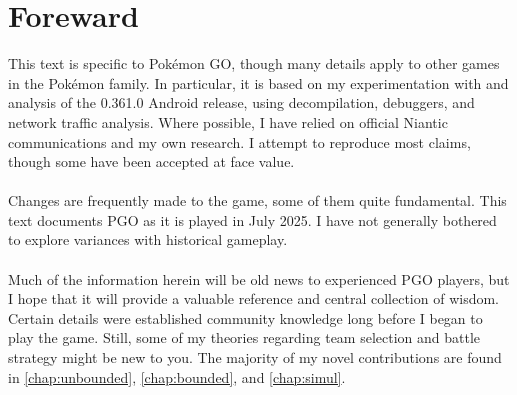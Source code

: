 \chapter{Foreward}

\noindent{}This text is specific to Pokémon GO, though many details
apply to other games in the Pokémon family.
In particular, it is based on my experimentation with and analysis of
 the 0.361.0 Android release, using decompilation, debuggers, and
 network traffic analysis.
Where possible, I have relied on official Niantic communications
 and my own research.
I attempt to reproduce most claims, though some have been accepted at face value.\\
\\
\noindent{}Changes are frequently made to the game, some of them quite fundamental.
This text documents PGO as it is played in July 2025.
I have not generally bothered to explore variances with historical gameplay.\\
\\
\noindent{}Much of the information herein will be old news to experienced
 PGO players, but I hope that it will provide a valuable reference and central collection of wisdom.
Certain details were established community knowledge long before I
 began to play the game.
Still, some of my theories regarding team selection and battle strategy might
  be new to you.
The majority of my novel contributions are found in \autoref{chap:unbounded},
  \autoref{chap:bounded}, and \autoref{chap:simul}.

